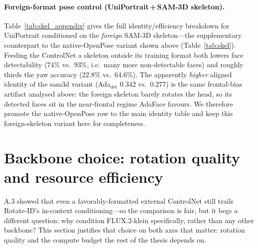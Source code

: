 \paragraph{Foreign-format pose control (UniPortrait\,+\,SAM-3D skeleton).}
Table~\ref{tab:skel_appendix} gives the full identity/efficiency breakdown for
UniPortrait conditioned on the \emph{foreign} SAM-3D skeleton---the supplementary
counterpart to the native-OpenPose variant shown above (Table~\ref{tab:skel}).
Feeding the ControlNet a skeleton
outside its training format both lowers face detectability ($74\%$ vs.\ $93\%$,
i.e.\ many more non-detectable faces) and roughly thirds the yaw accuracy
($22.8\%$ vs.\ $64.6\%$). The apparently \emph{higher} aligned identity of the
sam3d variant (Ada$_{\text{det}}$ $0.342$ vs.\ $0.277$) is the same frontal-bias
artifact analysed above: the foreign skeleton barely rotates the head,
so its detected faces sit in the near-frontal regime AdaFace favours. We therefore
promote the native-OpenPose row to the main identity table and keep this
foreign-skeleton variant here for completeness.

\begin{table}[t]\centering\small
\setlength{\tabcolsep}{4.5pt}
\caption[Pose-conditioned UniPortrait: native vs.\ foreign control]{\textbf{Pose-conditioned UniPortrait: native vs.\ foreign control}
($1400$ generations). The foreign SAM-3D skeleton yields far weaker rotation and
lower detectability than the native OpenPose skeleton; its higher aligned CSIM is
the frontal-bias artifact (it barely turns). The OpenPose row (also in
Table~\ref{tab:skel}) is the one promoted to the main results.}
\label{tab:skel_appendix}
\end{table}

\section{Backbone choice: rotation quality and resource efficiency}
\label{sec:appendix_backbone}
A.3 showed that even a favorably-formatted external ControlNet still trails
Rotate-ID's in-context conditioning---so the comparison is fair, but it begs a
different question: why condition FLUX.2-klein specifically, rather than any
other backbone? This section justifies that choice on both axes that matter:
rotation quality and the compute budget the rest of the thesis depends on.

